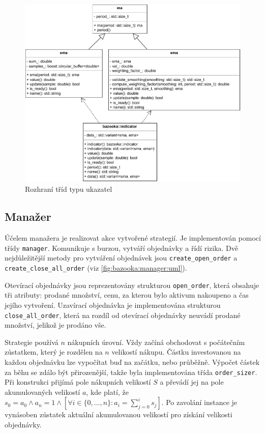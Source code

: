 \begin{figure}[htbp]
\centerline{\includegraphics[scale=0.85]{img/indicator-uml.pdf}}
\caption{Rozhraní tříd typu ukazatel}
\label{fig:indicator:uml}
\end{figure}

\subsection{Manažer}
Účelem manažera je realizovat akce vytvořené strategií.
Je implementován pomocí třídy \texttt{manager}.
Komunikuje s burzou, vytváří objednávky a řídí rizika.
Dvě nejdůležitější metody pro vytváření objednávek jsou \texttt{create\_open\_order} a \texttt{create\_close\_all\_order} (viz \ref{fig:bazooka:manager:uml}).

Otevírací objednávky jsou reprezentovány strukturou \texttt{open\_order}, která obsahuje tři atributy: prodané množství, cenu, za kterou bylo aktivum nakoupeno a čas jejího vytvoření.
Uzavírací objednávka je implementována strukturou \texttt{close\_all\_order}, která na rozdíl od otevírací objednávky neuvádí prodané množství, jelikož je prodáno vše.

Strategie používá $n$ nákupních úrovní.
Vždy začíná obchodovat s počátečním zůstatkem, který je rozdělen na $n$ velikostí nákupu.
Částku investovanou na každou objednávku lze vypočítat buď na začátku, nebo průběžně.
Výpočet částek za běhu se zdálo být přirozenější, takže byla implementována třída \texttt{order\_sizer}.
Při konstrukci přijímá pole nákupních velikostí $S$ a převádí jej na pole akumulovaných velikostí $a$, kde platí, že $s_0 = a_0 \land a_n = 1 \land [\forall i \in \{0,\dots,n\} : a_i = \sum_{j=0}^{i} s_j]$.
Po zavolání instance je vynásoben zůstatek aktuální akumulovanou velikostí pro získání velikosti objednávky.

